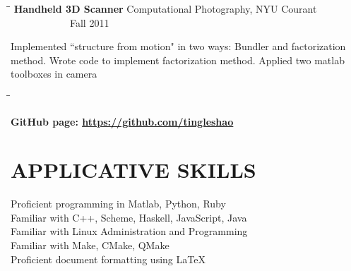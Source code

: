 \documentclass{res}
\begin{document}
\begin{resume}
  \begin{tabbing}
   \hspace{2.3in}\= \hspace{2.6in}\= \kill %
    {\bf Handheld 3D Scanner} \>Computational Photography, NYU Courant\> ~~~~~~~~~~~~Fall 2011\\
   \end{tabbing}\vspace{-20pt}
    Implemented ``structure from motion" in two ways: Bundler and factorization method. Wrote code to implement factorization method. Applied two matlab toolboxes in camera
  \begin{tabbing}
     \hspace{2.3in}\= \hspace{2.6in}\= \kill %

    {\bf GitHub page: \href{https://github.com/tingleshao}{\underline{https://github.com/tingleshao}}}\\[0.3cm]
  \end{tabbing}

\section{APPLICATIVE SKILLS}
    \vspace{0.05in}
    Proficient programming in Matlab, Python, Ruby  \\
    Familiar with C++, Scheme, Haskell, JavaScript, Java\\
    Familiar with Linux Administration and Programming \\
    Familiar with Make, CMake, QMake\\
    Proficient document formatting using \LaTeX \\


\end{resume}
\end{document}
